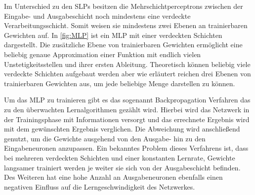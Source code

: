 Im Unterschied zu den SLPs besitzen die Mehrschichtperceptrons zwischen der Eingabe- und Ausgabeschicht noch mindestens eine verdeckte Verarbeitungsschicht. Somit weisen sie mindestens zwei Ebenen an trainierbaren Gewichten auf. In \autoref{fig:MLP} ist ein MLP mit einer verdeckten Schichten dargestellt. Die zusätzliche Ebene von trainierbaren Gewichten ermöglicht eine beliebig genaue Approximation einer Funktion mit endlich vielen Unstetigkeitsstellen und ihrer ersten Ableitung. Theoretisch können beliebig viele verdeckte Schichten aufgebaut werden aber wie \hbox{\citet{dkriesel07}} erläutert reichen drei Ebenen von trainierbaren Gewichten aus, um jede beliebige Menge darstellen zu können.

Um das MLP zu trainieren gibt es das sogenannt Backpropagation Verfahren das zu den überwachten Lernalgorithmen gezählt wird. Hierbei wird das Netzwerk in der Trainingsphase mit Informationen versorgt und das errechnete Ergebnis wird mit dem gewünschten Ergebnis verglichen. Die Abweichung wird anschließend genutzt, um die Gewichte ausgehend von den Ausgabe- hin zu den Eingabeneuronen anzupassen. Ein bekanntes Problem dieses Verfahrens ist, dass bei mehreren verdeckten Schichten und einer konstanten Lernrate, Gewichte langsamer trainiert werden je weiter sie sich von der Ausgabeschicht befinden. Des Weiteren hat eine hohe Anzahl an Ausgabeneuronen ebenfalls einen negativen Einfluss auf die Lerngeschwindigkeit des Netzwerkes.


